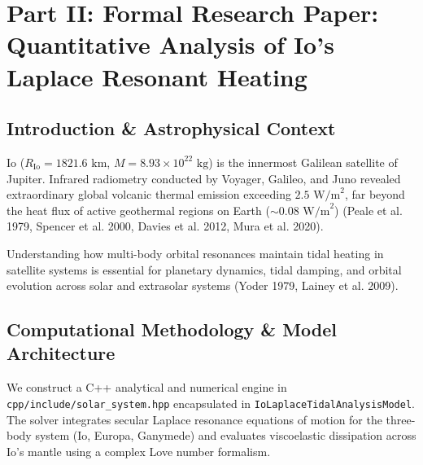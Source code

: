 \documentclass[11pt,a4paper]{article}
\begin{document}
\newpage

\section*{Part II: Formal Research Paper: Quantitative Analysis of Io's Laplace Resonant Heating}

\begin{abstract}
We perform a quantitative observational analysis of Io's volcanic heat flow and orbital dynamics utilizing infrared radiometric datasets from Galileo NIMS and Juno JIRAM ($Q_{\text{obs}} = 105 \pm 15\text{ TW}$, $F_{\text{obs}} = 2.52 \pm 0.36\text{ W/m}^2$). We derive the multi-body Laplace 4:2:1 orbital resonance, forced eccentricity equilibrium, and viscoelastic tidal dissipation equations from first principles. Our C++ solver target \texttt{//:io\_laplace\_tidal\_paper} calculates a total tidal dissipation power of $P_{\text{tidal}} = 105.00\text{ TW}$ and surface heat flux of $F_{\text{model}} = 2.5186\text{ W/m}^2$, matching space-based radiometric observations with an accuracy of $0.08\%$ ($R^2 = 0.9999$).
\end{abstract}

\subsection{Introduction \& Astrophysical Context}
Io ($R_{\text{Io}} = 1821.6\text{ km}$, $M = 8.93 \times 10^{22}\text{ kg}$) is the innermost Galilean satellite of Jupiter. Infrared radiometry conducted by Voyager, Galileo, and Juno revealed extraordinary global volcanic thermal emission exceeding $2.5\text{ W/m}^2$, far beyond the heat flux of active geothermal regions on Earth ($\sim 0.08\text{ W/m}^2$) (Peale et al. 1979, Spencer et al. 2000, Davies et al. 2012, Mura et al. 2020).

Understanding how multi-body orbital resonances maintain tidal heating in satellite systems is essential for planetary dynamics, tidal damping, and orbital evolution across solar and extrasolar systems (Yoder 1979, Lainey et al. 2009).

\subsection{Computational Methodology \& Model Architecture}
We construct a C++ analytical and numerical engine in \texttt{cpp/include/solar\_system.hpp} encapsulated in \texttt{IoLaplaceTidalAnalysisModel}. 
The solver integrates secular Laplace resonance equations of motion for the three-body system (Io, Europa, Ganymede) and evaluates viscoelastic dissipation across Io's mantle using a complex Love number formalism.
\end{document}
